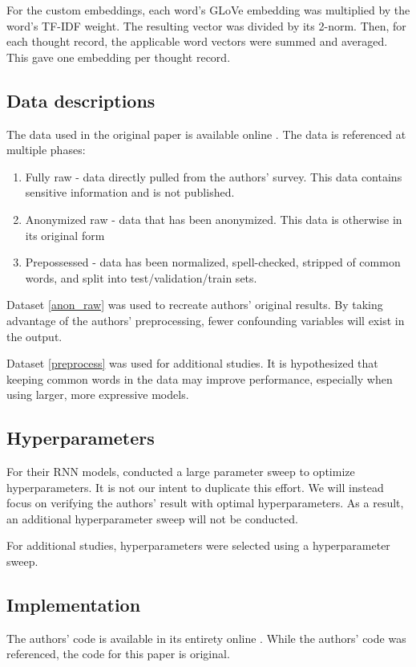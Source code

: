 \documentclass[11pt,a4paper]{article}
\begin{document}
For the custom embeddings, each word's GLoVe embedding was multiplied by the word's TF-IDF weight. The resulting vector was divided by its 2-norm. Then, for each thought record, the applicable word vectors were summed and averaged. This gave one embedding per thought record.

\subsection{Data descriptions}
The data used in the original paper is available online \citep{burger_2021_data}. The data is referenced at multiple phases: 
\begin{enumerate}
    \item Fully raw - data directly pulled from the authors' survey. This data contains sensitive information and is not published. 
    \item Anonymized raw - data that has been anonymized. This data is otherwise in its original form
    \label{anon_raw}
    \item Prepossessed - data has been normalized, spell-checked, stripped of common words, and split into test/validation/train sets. 
    \label{preprocess}
\end{enumerate}

Dataset \ref{anon_raw} was used to recreate authors' original results. By taking advantage of the authors' preprocessing, fewer confounding variables will exist in the output. 

Dataset \ref{preprocess} was used for additional studies. It is hypothesized that keeping common words in the data may improve performance, especially when using larger, more expressive models. 

\subsection{Hyperparameters}
For their RNN models, \citeauthor{burger_2021} conducted a large parameter sweep to optimize hyperparameters. It is not our intent to duplicate this effort. We will instead focus on verifying the authors' result with optimal hyperparameters. As a result, an additional hyperparameter sweep will not be conducted. 

For additional studies, hyperparameters were selected using a hyperparameter sweep. 

\subsection{Implementation}
The authors' code is available in its entirety online \citep{burger_2021_data}. While the authors' code was referenced, the code for this paper is original. 
\end{document}
